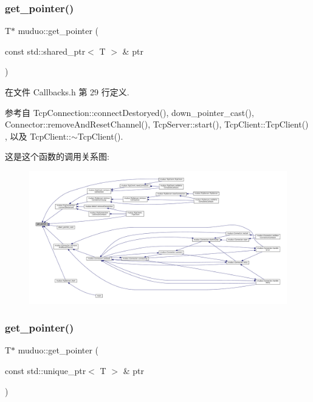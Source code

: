 \subsubsection{\texorpdfstring{get\+\_\+pointer()}{get\_pointer()}\hspace{0.1cm}{\footnotesize\ttfamily [1/2]}}
{\footnotesize\ttfamily T$\ast$ muduo\+::get\+\_\+pointer (\begin{DoxyParamCaption}\item[{const std\+::shared\+\_\+ptr$<$ T $>$ \&}]{ptr }\end{DoxyParamCaption})\hspace{0.3cm}{\ttfamily [inline]}}



在文件 Callbacks.\+h 第 29 行定义.



参考自 Tcp\+Connection\+::connect\+Destoryed(), down\+\_\+pointer\+\_\+cast(), Connector\+::remove\+And\+Reset\+Channel(), Tcp\+Server\+::start(), Tcp\+Client\+::\+Tcp\+Client() , 以及 Tcp\+Client\+::$\sim$\+Tcp\+Client().

这是这个函数的调用关系图\+:
\nopagebreak
\begin{figure}[H]
\begin{center}
\leavevmode
\includegraphics[width=350pt]{namespacemuduo_a98789775449e36c3c0c26004e19ef6bc_icgraph}
\end{center}
\end{figure}
\mbox{\label{namespacemuduo_aedcb2cb9b3d8f7bdfabeadec584a691c}} 
\subsubsection{\texorpdfstring{get\+\_\+pointer()}{get\_pointer()}\hspace{0.1cm}{\footnotesize\ttfamily [2/2]}}
{\footnotesize\ttfamily T$\ast$ muduo\+::get\+\_\+pointer (\begin{DoxyParamCaption}\item[{const std\+::unique\+\_\+ptr$<$ T $>$ \&}]{ptr }\end{DoxyParamCaption})\hspace{0.3cm}{\ttfamily [inline]}}



